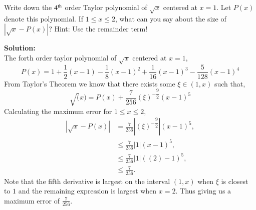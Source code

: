 \documentclass[12pt]{article}
\makeatletter
\theoremstyle{homework}
\newenvironment{exercise}[1]
{\def\@currentlabel{#1}\exercisecore}
{\endexercisecore}
\newcommand{\localhead}[1]{\par\smallskip\noindent\textbf{#1}\nobreak\\}%
\newcommand\solution{\localhead{Solution:}}
\makeatother
\begin{document}
\begin{exercise}{DM 1}
Write down the $4^{\rm th}$ order Taylor
polynomial of $\sqrt{x}$ centered at $x=1$.  Let
$P(x)$ denote this polynomial. If $1\le x \le 2$,
what can you say about the size of $|\sqrt{x}-P(x)|$?
Hint: Use the remainder term!
\end{exercise} 

\solution
The forth order taylor polynomial of $\sqrt{x}$ centered at $x = 1$, 
\begin{equation*}
  P(x) = 1 + \dfrac{1}{2}(x-1)  - \dfrac{1}{8}(x - 1)^2 + \dfrac{1}{16}(x - 1)^3 - \dfrac{5}{128}(x - 1)^4
\end{equation*}
From Taylor's Theorem we know that there exists some $\xi \in (1, x)$ such that,
\begin{equation*}
  \sqrt(x) = P(x) + \frac{7}{256}(\xi)^{-\dfrac{9}{2}}(x - 1)^5
\end{equation*}
Calculating the maximum error for $1\le x \le 2$,
\begin{align*}
  |\sqrt{x}-P(x)| &= \frac{7}{256}|(\xi)^{-\dfrac{9}{2}}|(x - 1)^5,\\
  &\leq \frac{7}{256}|1|(x - 1)^5,\\
  &\leq \frac{7}{256}|1|((2) - 1)^5,\\
  &\leq \frac{7}{256}.
\end{align*}
Note that the fifth derivative is largest on the interval $(1,x)$ when $\xi$ is closest to $1$ and the remaining expression is 
largest when $x = 2$. Thus giving us a maximum error of $\frac{7}{256}$.
\end{document}
